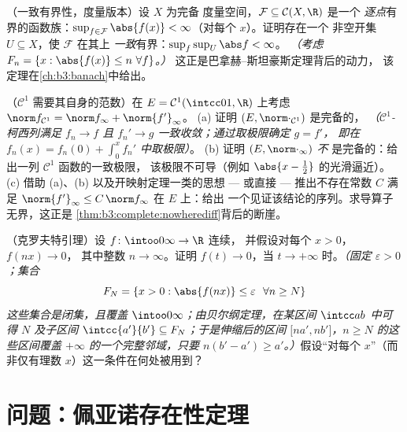 \begin{exercise}[$\star\star\star$]\label{exo:b3:complete:10}
（一致有界性，度量版本）设 $X$ 为完备
度量空间，$\mathcal F \subseteq \mathcal C(X, \R)$ 是一个
\emph{逐点}有界的函数族：$\sup_{f \in \mathcal
F}\abs{f(x)} < \infty$（对每个 $x$）。证明存在一个
非空开集 $U \subseteq X$，使 $\mathcal F$ 在其上
\emph{一致}有界：$\sup_{f}\sup_U \abs f < \infty$。
\emph{（考虑 $F_n = \{x : \abs{f(x)} \leq n\ \forall f\}$。）}
这正是巴拿赫–斯坦豪斯定理背后的动力，
该定理在\cref{ch:b3:banach}中给出。
\end{exercise}

\begin{exercise}[$\star\star$]\label{exo:b3:complete:11}
（$\mathcal C^1$ 需要其自身的范数）在 $E = \mathcal
C^1(\intcc01, \R)$ 上考虑 $\norm f_{\mathcal C^1} = \norm
f_\infty + \norm{f'}_\infty$。
(a) 证明 $(E, \norm\cdot_{\mathcal C^1})$ 是完备的，
\emph{（$\mathcal C^1$-柯西列满足 $f_n \to f$ 且
$f_n' \to g$ 一致收敛；通过取极限确定 $g = f'$，
即在 $f_n(x) = f_n(0) + \int_0^xf_n'$ 中取极限）}。
(b) 证明 $(E, \norm\cdot_\infty)$ \emph{不}
是完备的：给出一列 $\mathcal C^1$ 函数的一致极限，
该极限不可导（例如
$\abs{x - \tfrac12}$ 的光滑逼近）。
(c) 借助 (a)、(b) 以及开映射定理一类的思想
--- 或直接 --- 推出不存在常数 $C$ 满足
$\norm{f'}_\infty \leq C\,\norm f_\infty$ 在 $E$ 上：给出
一个见证该结论的序列。求导算子无界，这正是
\cref{thm:b3:complete:nowherediff}背后的断崖。
\end{exercise}

\begin{exercise}[$\star\star\star$]\label{exo:b3:complete:12}
（克罗夫特引理）设 $f\colon\intoo0\infty\to\R$ 连续，
并假设对每个 $x > 0$，$f(nx) \to 0$，
其中整数 $n \to \infty$。证明 $f(t) \to 0$，当 $t \to
+\infty$ 时。\emph{（固定 $\varepsilon > 0$；集合
\[
F_N = \{x > 0 : \abs{f(nx)} \leq \varepsilon\ \ \forall n
\geq N\}
\]
这些集合是闭集，且覆盖 $\intoo0\infty$；由贝尔纲定理，在某区间
$\intcc ab$ 中可得 $N$ 及子区间 $\intcc{a'}{b'}
\subseteq F_N$；于是伸缩后的区间 $\bigl[na', nb'\bigr]$，$n
\geq N$ 的这些区间覆盖 $+\infty$ 的一个完整邻域，只要
$n(b' - a') \geq a'$。）}假设“对每个
$x$”（而非仅有理数 $x$）这一条件在何处被用到？
\end{exercise}

\section{问题：佩亚诺存在性定理}

